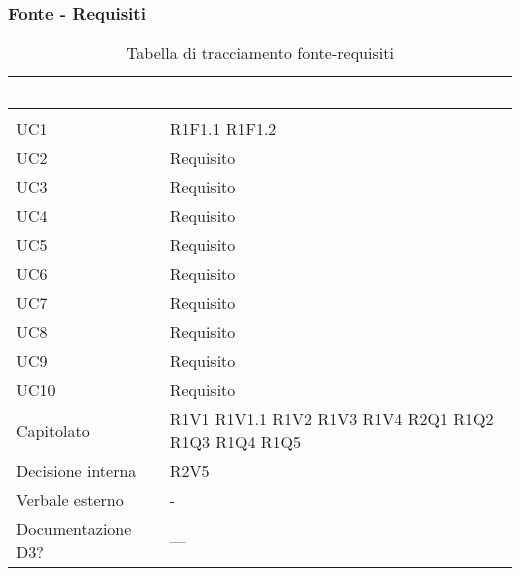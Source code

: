 \subsubsection{Fonte - Requisiti}
\renewcommand{\arraystretch}{1.5}
\begin{center}
\begin{longtable}{C{6cm} C{6cm}}
		\textcolor{white}{\textbf{Fonte}} & 
		\textcolor{white}{\textbf{Requisiti}}\\
		\endfirsthead
	    \\
	    \endfoot
	    \caption{Tabella di tracciamento fonte-requisiti}
	    \endlastfoot

UC1 &  	R1F1.1 \newline
		R1F1.2 \\
			
		  
UC2 & Requisito \\

UC3 & Requisito \\

UC4 & Requisito \\

UC5 & Requisito \\

UC6 & Requisito \\

UC7 & Requisito \\

UC8 & Requisito \\

UC9 & Requisito \\

UC10 & Requisito \\

Capitolato &  	R1V1 \newline
				R1V1.1 \newline
				R1V2 \newline
				R1V3 \newline
				R1V4 \newline
				R2Q1 \newline
				R1Q2 \newline
				R1Q3 \newline
				R1Q4 \newline
				R1Q5 \\

Decisione interna & R2V5 \\

Verbale esterno & - \\

Documentazione D3? & --- \\

\end{longtable}
\end{center}